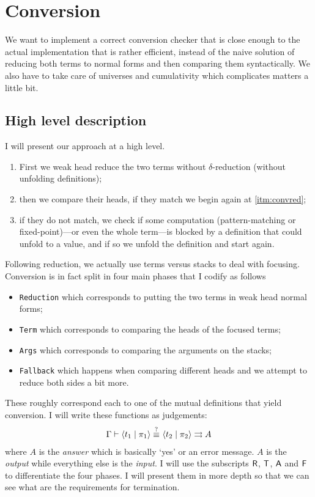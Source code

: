 \chapter{Conversion}

We want to implement a correct conversion checker that is close enough to the
actual implementation that is rather efficient, instead of the naive solution
of reducing both terms to normal forms and then comparing them syntactically.
We also have to take care of universes and cumulativity which complicates
matters a little bit.

\section{High level description}

I will present our approach at a high level.
\begin{enumerate}[label=(\arabic*)]
  \item \label{itm:convred} First we weak head reduce the two terms without
  \(\delta\)-reduction (\ie without unfolding definitions);
  \item then we compare their heads, if they match we begin again at
  \ref{itm:convred};
  \item if they do not match, we check if some computation (pattern-matching
  or fixed-point)---or even the whole term---is blocked by a definition that
  could unfold to a value, and if so we unfold the definition and start again.
\end{enumerate}

Following reduction, we actually use terms versus stacks to deal with focusing.
Conversion is in fact split in four main phases that I codify as follows
\begin{itemize}
  \item \texttt{Reduction} which corresponds to putting the two terms
  in weak head normal forms;
  \item \texttt{Term} which corresponds to comparing the heads of the
  focused terms;
  \item \texttt{Args} which corresponds to comparing the arguments
  on the stacks;
  \item \texttt{Fallback} which happens when comparing different heads
  and we attempt to reduce both sides a bit more.
\end{itemize}
These roughly correspond each to one of the mutual definitions that yield
conversion. I will write these functions as judgements:
\[
  \begin{array}{c}
    \Gamma \vdash \langle t_1 \mid \pi_1 \rangle \overset{?}{\equiv}_{} \langle t_2 \mid \pi_2 \rangle \rightrightarrows A
  \end{array}
\]
where \(A\) is the \emph{answer} which is basically `yes' or an error message.
\(A\) is the \emph{output} while everything else is the \emph{input}.
I will use the subscripts \(\mathsf{R}\), \(\mathsf{T}\), \(\mathsf{A}\) and \(\mathsf{F}\)
to differentiate the four phases.
I will present them in more depth so that we can see what are
the requirements for termination.

